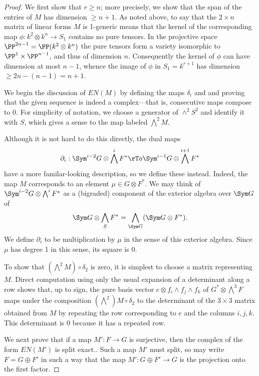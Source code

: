 \begin{proof} We first show that $r\geq n$; more precisely, we show that the span of the entries of $M$ has dimension $\geq n+1$. As noted above, to say that the $2\times n$ matrix of linear forms $M$ is 1-generic means that
the kernel of the corresponding map $ \phi: k^2\otimes k^n \to S_1$ contains no pure tensors. In the projective
space $\PP^{2n-1} = \PP(k^2\otimes k^n)$ the pure tensors form a variety isomorphic to $\PP^1\times \PP^{n-1}$, and thus of dimension $n$. Consequently the kernel of $\phi$ can have dimension at most $n-1$, whence the image of $\phi$ 
in $S_1 = k^{r+1}$ has dimension  $\geq 2n-(n-1) = n+1$. 

We begin the discussion of $EN(M)$ by defining the maps $\delta_i$ and and proving that the given sequence is indeed a complex---that is, consecutive maps compose to 0. For simplicity of notation, we choose a generator of $\wedge^2 S^2$
 and identify it with $S$, which gives a sense to the map labeled $\bigwedge^2M$.
 
  Although it is not hard to do this directly, the dual maps
 $$
 \partial_i: \Sym^{i-2} G \otimes \bigwedge^i F^* \rTo \Sym^{i-1} G \otimes \bigwedge^{i+1} F^*
 $$
 have a more familar-looking description, so we define these instead. Indeed, the map $M$ corresponds to an
 element $\mu\in G\otimes F^*$. We may think of $ \Sym^{i-2} G \otimes \bigwedge^i  F^*$
 as a (bigraded) component of the exterior algebra over $ \Sym G$ of 
 $$
  \Sym G \otimes \bigwedge_S  F^*= \bigwedge_{ \Sym G} (\Sym G \otimes  F^*).
 $$
We define $\partial_i$ to be  multiplication by $\mu$ in the sense of this exterior algebra. Since $\mu$ has degree 1
in this sense, its square is 0. 

To show that $(\bigwedge^2 M)\circ \delta_2$ is zero, it is simplest to choose a matrix representing $M$.
Direct computation using only the usual expansion of a determinant
along a row shows that, up to sign, the
pure basis vector $e\otimes f_i\wedge f_j\wedge f_k$ of $G^*\otimes \bigwedge^3 F$
maps under the composition $(\bigwedge^2) M\circ \delta_2$ to the determinant
of the $3\times 3$ matrix obtained from $M$ by repeating the row corresponding to $e$ and
the columns $i,j,k$. This determinant is 0 because it has a repeated row.

We next prove that if a map $M': F\to G$ is surjective, then the complex of the form $EN(M')$
is split exact.. Such a map $M'$ must split, so
may write $F = G\oplus F'$ in such a way that the map $M': G\oplus F' \to G$ is the projection onto the first factor. 


\end{proof}
